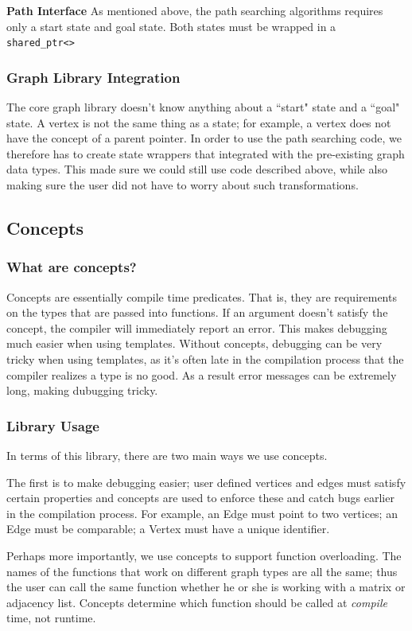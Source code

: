 \documentclass{article}
\begin{document}
\textbf{Path Interface}
As mentioned above, the path searching algorithms requires only a start state and goal state. Both states must be wrapped in a \texttt{shared\_ptr<>}

\subsubsection{Graph Library Integration}
The core graph library doesn't know anything about a ``start" state and a ``goal" state. A vertex is not the same thing as a state; for example, a vertex does not have the concept of a parent pointer. In order to use the path searching code, we therefore has to create state wrappers that integrated with the pre-existing graph data types. This made sure we could still use code described above, while also making sure the user did not have to worry about such transformations.

\subsection{Concepts}
\subsubsection{What are concepts?}
Concepts are essentially compile time predicates. That is, they are requirements on the types that are passed into functions. If an argument doesn't satisfy the concept, the compiler will immediately report an error. This makes debugging much easier when using templates. Without concepts, debugging can be very tricky when using templates, as it's often late in the compilation process that the compiler realizes a type is no good. As a result error messages can be extremely long, making dubugging tricky. 
\subsubsection{Library Usage}
In terms of this library, there are two main ways we use concepts.
\par
The first is to make debugging easier; user defined vertices and edges must satisfy certain properties and concepts are used to enforce these and catch bugs earlier in the compilation process. For example, an Edge must point to two vertices; an Edge must be comparable; a Vertex must have a unique identifier. 
\par
Perhaps more importantly, we use concepts to support function overloading. The names of the functions that work on different graph types are all the same; thus the user can call the same function whether he or she is working with a matrix or adjacency list. Concepts determine which function should be called at \emph{compile} time, not runtime. 
\end{document}
